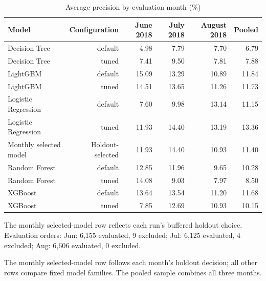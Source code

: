 \begin{table}[htbp]
\centering
\small
\caption{Average precision by evaluation month (\%)}
\begin{tabular}{lrrrrr}
\toprule
Model & Configuration & June 2018 & July 2018 & August 2018 & Pooled \\
\midrule
Decision Tree & default & 4.98 & 7.79 & 7.70 & 6.79 \\
Decision Tree & tuned & 7.41 & 9.50 & 7.81 & 7.88 \\
LightGBM & default & 15.09 & 13.29 & 10.89 & 11.84 \\
LightGBM & tuned & 14.51 & 13.65 & 11.26 & 11.73 \\
Logistic Regression & default & 7.60 & 9.98 & 13.14 & 11.15 \\
Logistic Regression & tuned & 11.93 & 14.40 & 13.19 & 13.36 \\
Monthly selected model & Holdout-selected & 11.93 & 14.40 & 10.93 & 11.40 \\
Random Forest & default & 12.85 & 11.96 & 9.65 & 10.28 \\
Random Forest & tuned & 14.08 & 9.03 & 7.97 & 8.50 \\
XGBoost & default & 13.64 & 13.54 & 11.20 & 11.68 \\
XGBoost & tuned & 7.85 & 12.69 & 10.93 & 10.15 \\
\bottomrule
\end{tabular}
\par\smallskip\begin{minipage}{\linewidth}\footnotesize The monthly selected-model row reflects each run’s buffered holdout choice. Evaluation orders: Jun: 6,155 evaluated, 9 excluded; Jul: 6,125 evaluated, 4 excluded; Aug: 6,606 evaluated, 0 excluded.\end{minipage}
\end{table}
The monthly selected-model row follows each month’s holdout decision; all other rows compare fixed model families. The pooled sample combines all three months.


